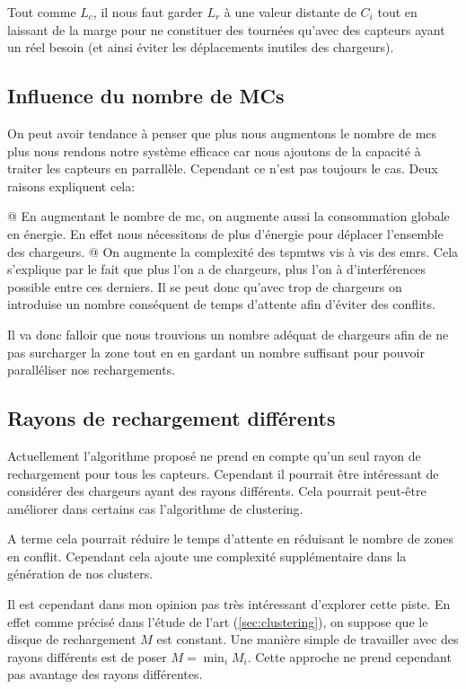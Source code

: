 \documentclass[noposter,final]{polytech/polytech}
\begin{document}
			Tout comme $L_c$, il nous faut garder $L_r$ à une valeur distante de $C_i$ tout en laissant de la marge pour ne constituer des tournées qu'avec des capteurs ayant un réel besoin (et ainsi éviter les déplacements inutiles des chargeurs).
		
		\subsection{Influence du nombre de MCs}
			On peut avoir tendance à penser que plus nous augmentons le nombre de \glspl{mc} plus nous rendons notre système efficace car nous ajoutons de la capacité à traiter les capteurs en parrallèle.
			Cependant ce n'est pas toujours le cas.
			Deux raisons expliquent cela:
			\begin{easylist}
				@ En augmentant le nombre de \gls{mc}, on augmente aussi la consommation globale en énergie.
				En effet nous nécessitons de plus d'énergie pour déplacer l'ensemble des chargeurs.
				@ On augmente la complexité des \glspl{tspmtw} vis à vis des \glspl{emr}.
				Cela s'explique par le fait que plus l'on a de chargeurs, plus l'on à d'interférences possible entre ces derniers.
				Il se peut donc qu'avec trop de chargeurs on introduise un nombre conséquent de temps d'attente afin d'éviter des conflits.
			\end{easylist}
			
			Il va donc falloir que nous trouvions un nombre adéquat de chargeurs afin de ne pas surcharger la zone tout en en gardant un nombre suffisant pour pouvoir paralléliser nos rechargements.
		
		\subsection{Rayons de rechargement différents}
			Actuellement l'algorithme proposé ne prend en compte qu'un seul rayon de rechargement pour tous les capteurs.
			Cependant il pourrait être intéressant de considérer des chargeurs ayant des rayons différents.
			Cela pourrait peut-être améliorer dans certains cas l'algorithme de clustering.
			
			A terme cela pourrait réduire le temps d'attente en réduisant le nombre de zones en conflit.
			Cependant cela ajoute une complexité supplémentaire dans la génération de nos clusters.
			
			Il est cependant dans mon opinion pas très intéressant d'explorer cette piste.
			En effet comme précisé dans l'étude de l'art (\autoref{sec:clustering}), on suppose que le disque de rechargement $M$ est constant.
			Une manière simple de travailler avec des rayons différents est de poser $M=\min_{i}M_i$.
			Cette approche ne prend cependant pas avantage des rayons différentes.
			
\end{document}
